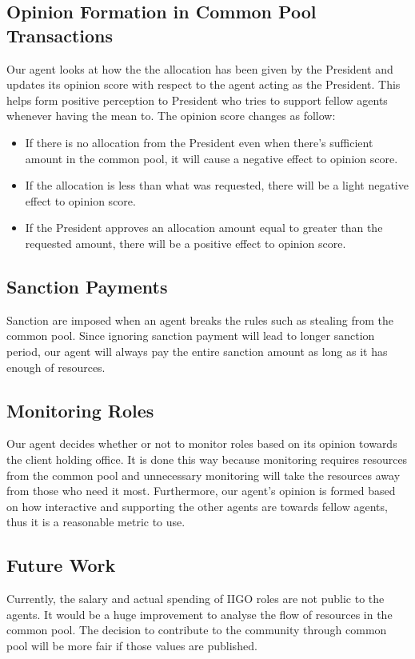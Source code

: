 \subsection{Opinion Formation in Common Pool Transactions}
Our agent looks at how the the allocation has been given by the President and updates its opinion score with respect to the agent acting as the President. This helps form positive perception to President who tries to support fellow agents whenever having the mean to. The opinion score changes as follow:



\begin{itemize}
    \item If there is no allocation from the President even when there's sufficient amount in the common pool, it will cause a negative effect to opinion score.
    \item If the allocation is less than what was requested, there will be a light negative effect to opinion score.
    \item If the President approves an allocation amount equal to greater than the requested amount, there will be a positive effect to opinion score. 
\end{itemize}

\subsection{Sanction Payments}
Sanction are imposed when an agent breaks the rules such as stealing from the common pool. Since ignoring sanction payment will lead to longer sanction period, our agent will always pay the entire sanction amount as long as it has enough of resources. 

\subsection{Monitoring Roles} 
Our agent decides whether or not to monitor roles based on its opinion towards the client holding office. It is done this way because monitoring requires resources from the common pool and unnecessary monitoring will take the resources away from those who need it most. Furthermore, our agent's opinion is formed based on how interactive and supporting the other agents are towards fellow agents, thus it is a reasonable metric to use.

\subsection{Future Work}
Currently, the salary and actual spending of IIGO roles are not public to the agents. It would be a huge improvement to analyse the flow of resources in the common pool. The decision to contribute to the community through common pool will be more fair if those values are published. \newline

